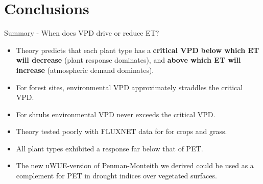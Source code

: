 \documentclass[aspectratio=169]{beamer}
\begin{document}
\section{Conclusions}


\begin{frame}{Summary - When does VPD drive or reduce ET?}
  \begin{itemize}
  \item Theory predicts that each plant type has a \textbf{critical VPD} \textbf{below which ET will decrease} (plant response dominates), and \textbf{above which ET will increase} (atmospheric demand dominates).
  \item For forest sites, environmental VPD approximately straddles the critical VPD.
  \item For shrubs environmental VPD never exceeds the critical VPD.
  \item Theory tested poorly with FLUXNET data for for crops and grass. 
  \item All plant types exhibited a response far below that of PET.
  \item The new uWUE-version of Penman-Monteith we derived could be used as a complement for PET in drought indices over vegetated surfaces.
  \end{itemize}
\end{frame}
\end{document}
